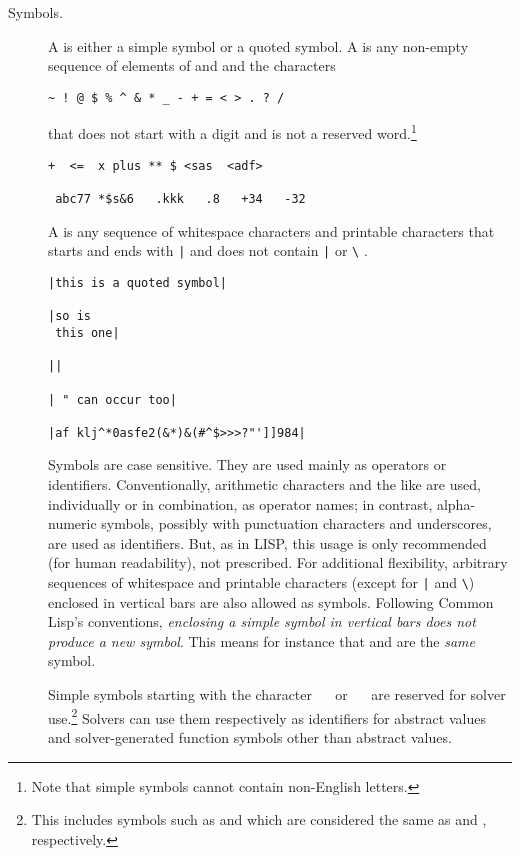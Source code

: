 \begin{description}
\item[Symbols.]
A  is either a simple symbol or a quoted symbol.
A  is any non-empty sequence of elements of  and 
 and the characters
\begin{center}
\verb|~ ! @ $ % ^ & * _ - + = < > . ? /|
\end{center}
that does not start with a digit and is not a reserved word.\footnote{%
Note that simple symbols cannot contain non-English letters.
}

\begin{lstlisting}[linewidth=25.5em]
 +  <=  x plus ** $ <sas  <adf> 
 
 abc77 *$s&6   .kkk   .8   +34   -32 
\end{lstlisting}

A  is any sequence of whitespace characters and printable characters
that starts and ends with \verb+|+ and does not contain \verb+|+ or \verb+\+ .
\smallskip

\newpage
\begin{lstlisting}[linewidth=25.5em]
|this is a quoted symbol|

|so is 
 this one|

||

| " can occur too|

|af klj^*0asfe2(&*)&(#^$>>>?"']]984|
\end{lstlisting}

Symbols are case sensitive.
They are used mainly as operators or identifiers.
Conventionally, arithmetic characters and the like are used, 
individually or in combination, as operator names;
in contrast, alpha-numeric symbols, possibly with punctuation characters and underscores, are used as identifiers.
But, as in LISP, this usage is only recommended (for human readability),
not prescribed.
For additional flexibility, arbitrary sequences of whitespace and printable characters 
(except for \verb+|+ and \verb+\+)
enclosed in vertical bars are also allowed as symbols.
Following Common Lisp's conventions, 
\emph{enclosing a simple symbol in vertical bars does not produce a new symbol}.
This means for instance that  and  are the \emph{same} symbol.

Simple symbols starting with the character
\  \ or \  \  are reserved for solver use.\footnote{%
This includes symbols such as  and 
which are considered the same as  and , respectively.
}
Solvers can use them respectively as identifiers for abstract values and
solver-generated function symbols other than abstract values.



\end{description}
